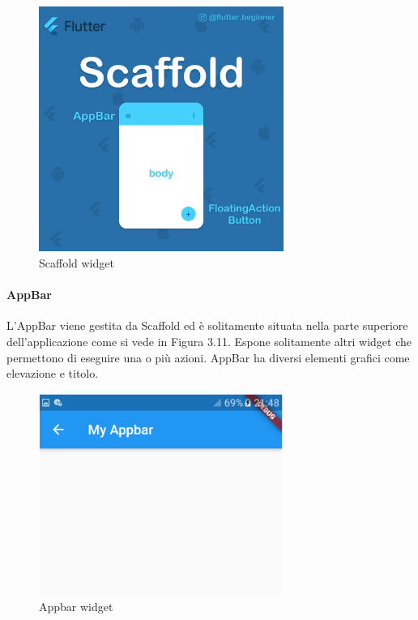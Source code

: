 \begin{figure}[htbp]	
	\centering
	\includegraphics[width=8cm]{immagini/scaffold.png}
	\caption{Scaffold widget}
	\label{fig:Scaffold widget}
\end{figure}

\newpage

\paragraph{AppBar}
L'AppBar viene gestita da Scaffold ed è solitamente situata nella parte superiore dell'applicazione come si vede in Figura 3.11. Espone solitamente altri widget che permettono di eseguire una o più azioni.
AppBar ha diversi elementi grafici come elevazione e titolo.
\begin{figure}[htbp]	
	\centering
	\includegraphics[width=8cm]{immagini/appbar.png}
	\caption{Appbar widget}
	\label{fig:Appbar widget}
\end{figure}


